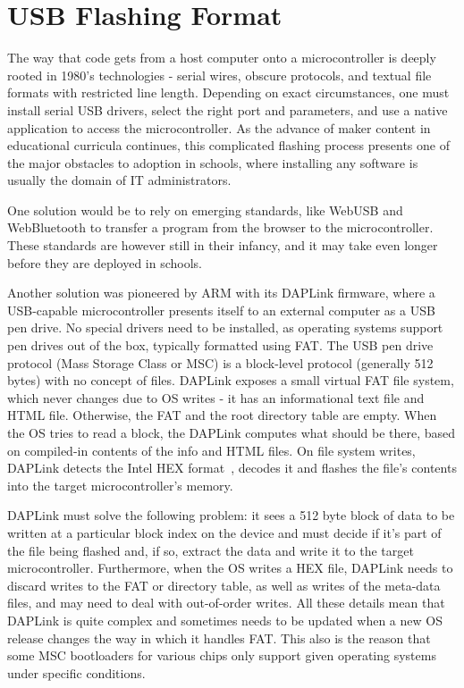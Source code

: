 \section{USB Flashing Format}
\label{sec:uf2}

The way that code gets from a host computer onto a microcontroller is deeply rooted in 1980's technologies - 
serial wires, obscure protocols, and textual file formats with restricted line length. Depending on exact circumstances,
one must install serial USB drivers, select the right port and parameters, and use a native application to access
the microcontroller. As the advance of maker content in educational curricula continues,
this complicated flashing process presents one of the major obstacles to adoption in schools, 
where installing any software is usually the domain of IT administrators.

One solution would be to rely on emerging standards, like WebUSB and WebBluetooth to transfer a program from the browser 
to the microcontroller. These standards are however still in their infancy, and it may take even longer before they are 
deployed in schools.

Another solution was pioneered by ARM with its DAPLink firmware, where a USB-capable microcontroller presents itself 
to an external computer as a USB pen drive. No special drivers need to be installed, as operating systems support pen
drives out of the box, typically formatted using FAT. The USB pen drive protocol (Mass Storage Class or MSC) is a
block-level protocol (generally 512 bytes) with no concept of files. DAPLink exposes a small virtual FAT file system, which
never changes due to OS writes - it has an informational text file and HTML file. Otherwise, the FAT and the root 
directory table are empty. When the OS tries to read a block, the DAPLink computes what should be there, 
based on compiled-in contents of the info and HTML files.
On file system writes, DAPLink detects the Intel HEX format~\cite{IntelHEX}, 
decodes it and flashes the file's contents into the target microcontroller's memory. 

DAPLink must solve the following problem: it sees a 512 byte block of data to be written
at a particular block index on the device and must decide if it's part of the file being flashed and, if so, extract
the data and write it to the target microcontroller. Furthermore, when the OS writes a HEX file, DAPLink needs to discard
writes to the FAT or directory table, as well as writes of the meta-data files, and may need to deal with out-of-order writes.
All these details mean that DAPLink is quite complex and sometimes needs to be updated when a new OS release changes the way
in which it handles FAT. This also is the reason that some MSC bootloaders for various chips only support given operating
systems under specific conditions.


